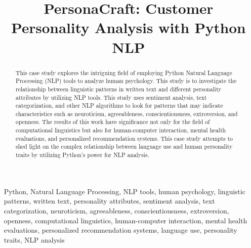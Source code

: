 \documentclass[conference]{IEEEtran}
\begin{document}
    \title{PersonaCraft: Customer Personality Analysis with Python NLP}

    \author{
    }

    \maketitle

    \begin{abstract}
        This case study explores the intriguing field of employing Python Natural Language Processing
        (NLP) tools to analyze human psychology. This study is to investigate the relationship
        between linguistic patterns in written text and different personality attributes by
        utilizing NLP tools. This study uses sentiment analysis, text categorization, and other NLP algorithms
        to look for patterns that may indicate characteristics such as neuroticism, agreeableness, conscientiousness,
        extroversion, and openness. The results of this work have significance not only for the
        field of computational linguistics but also for human-computer interaction, mental health evaluations,
        and personalized recommendation systems. This case study attempts to shed light on the complex
        relationship between language use and human personality traits by utilizing Python's power for
        NLP analysis.
    \end{abstract}

    \begin{IEEEkeywords}
        Python, Natural Language Processing, NLP tools, human psychology, linguistic patterns,
        written text, personality attributes, sentiment analysis, text categorization, neuroticism, agreeableness,
        conscientiousness, extroversion, openness, computational linguistics, human-computer
        interaction, mental health evaluations, personalized recommendation systems, language use,
        personality traits, NLP analysis
    \end{IEEEkeywords}
\end{document}
